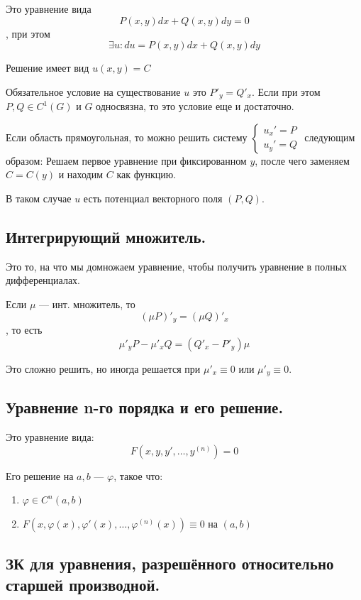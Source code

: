 Это уравнение вида
\[P(x, y) dx + Q(x, y)dy = 0\]
, при этом
\[\exists u : du = P(x, y) dx + Q(x, y) dy\]

Решение имеет вид \(u(x, y) = C\)

Обязательное условие на существование \(u\) это \(P'_y = Q'_x\). Если при этом \(P, Q\in C^1(G)\) и \(G\) односвязна, то это условие еще и достаточно.

Если область прямоугольная, то можно решить систему \(\begin{cases}
    u_x' = P \\
    u_y' = Q
\end{cases}\) следующим образом: Решаем первое уравнение при фиксированном \(y\), после чего заменяем \(C = C(y)\) и находим \(C\) как функцию.

В таком случае \(u\) есть потенциал векторного поля \((P, Q)\).

\subsection*{Интегрирующий множитель.}

Это то, на что мы домножаем уравнение, чтобы получить уравнение в полных дифференциалах.

Если \(\mu\) --- инт. множитель, то
\[(\mu P)'_y = (\mu Q)'_x\]
, то есть
\[\mu'_y P - \mu'_x Q = (Q'_x - P'_y) \mu\]

Это сложно решить, но иногда решается при \(\mu'_x \equiv 0\) или \(\mu'_y \equiv 0\).

\subsection*{Уравнение n-го порядка и его решение.}

Это уравнение вида:
\[F(x, y, y', \dots , y^{(n)}) = 0\]

Его решение на \(a, b\) --- \(\varphi\), такое что:
\begin{enumerate}
    \item \(\varphi\in C^n(a, b)\)
    \item \(F(x, \varphi(x), \varphi'(x), \dots , \varphi^{(n)}(x)) \equiv 0\) на \((a, b)\)
\end{enumerate}

\subsection*{ЗК для уравнения, разрешённого относительно старшей производной.}

